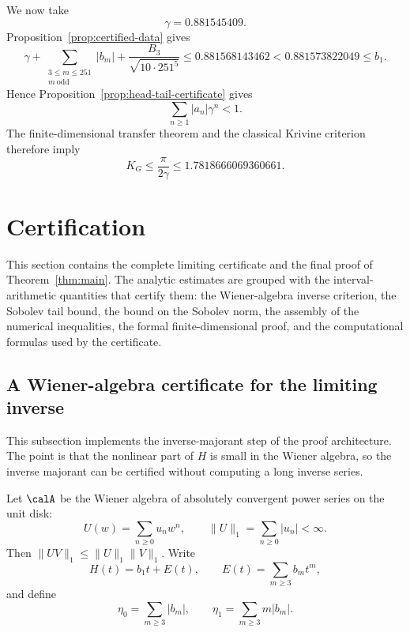 We now take
\[
\gamma=0.881545409.
\]
Proposition~\ref{prop:certified-data} gives
\[
\gamma
+
\sum_{\substack{3\le m\le251\\m\ \mathrm{odd}}}|b_m|
+
\frac{B_3}{\sqrt{10\cdot251^5}}
\le
0.881568143462
<
0.881573822049
\le b_1.
\]
Hence Proposition~\ref{prop:head-tail-certificate} gives
\[
\sum_{n\ge1}|a_n|\gamma^n<1.
\]
The finite-dimensional transfer theorem and the classical Krivine
criterion therefore imply
\[
K_G
\le
\frac{\pi}{2\gamma}
\le
1.7818666069360661.
\]




\section{Certification}
\label{sec:certification}

This section contains the complete limiting certificate and the final proof of Theorem~\ref{thm:main}.  The analytic estimates are grouped with the interval-arithmetic quantities that certify them: the Wiener-algebra inverse criterion, the Sobolev tail bound, the bound on the Sobolev norm, the assembly of the numerical inequalities, the formal finite-dimensional proof, and the computational formulas used by the certificate.


\subsection{A Wiener-algebra certificate for the limiting inverse}\label{sec:wiener}

This subsection implements the inverse-majorant step of the proof architecture.  The point is that the nonlinear part of $H$ is small in the Wiener algebra, so the inverse majorant can be certified without computing a long inverse series.

\begin{definition}\label{def:wiener-data}
Let $\calA$ be the Wiener algebra of absolutely convergent power series on the unit disk:
\[
  U(w)=\sum_{n\ge0}u_nw^n,
  \qquad
  \|U\|_1=\sum_{n\ge0}|u_n|<\infty.
\]
Then $\|UV\|_1\le\|U\|_1\|V\|_1$.  Write
\begin{equation}\label{eq:H-linear-nonlinear}
  H(t)=b_1t+E(t),
  \qquad
  E(t)=\sum_{m\ge3}b_mt^m,
\end{equation}
and define
\begin{equation}\label{eq:eta0eta1}
  \eta_0=\sum_{m\ge3}|b_m|,
  \qquad
  \eta_1=\sum_{m\ge3}m|b_m|.
\end{equation}
\end{definition}

